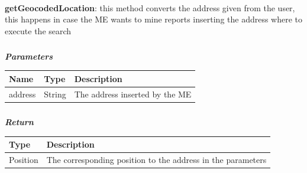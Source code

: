					\paragraph{}
							\textbf{getGeocodedLocation}: this method converts the address given from the user, this happens in case the ME wants to mine reports inserting the address where to execute the search
							\subparagraph{}
							\vspace{-3mm}
							\textit{\textbf{Parameters}}
							\vspace{-2mm}
								\begin{table}[!h]
									\begin{tabular}{L{0.15\textwidth}L{0.15\textwidth}L{0.5\textwidth}}
										\toprule
										\textbf{Name} & \textbf{Type} & \textbf{Description} \\
										\midrule
								  		address & String & The address inserted by the ME \\
								 		\bottomrule
									\end{tabular}
								\end{table}
							\subparagraph{}
							\vspace{-6mm}
								\textit{\textbf{Return}}
								\vspace{-2mm}
									\begin{table}[!h]
									\begin{tabular}{L{0.15\textwidth}L{0.65\textwidth}}
										\toprule
										\textbf{Type} & \textbf{Description} \\
										\midrule
								  		Position & The corresponding position to the address in the parameters \\
								 		\bottomrule
									\end{tabular}
								\end{table}
					\clearpage

